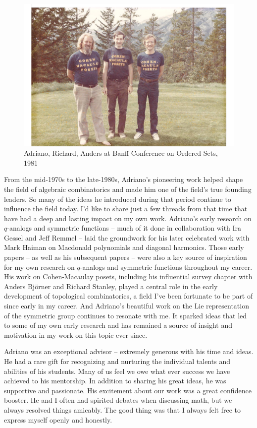 \documentclass{notices}
\begin{document}
\begin{figure}
    \centering
    \includegraphics[width=\linewidth]{Michelle_Wachs/cmposets.pdf} 
  {\footnotesize Adriano, Richard, Anders at Banff Conference on Ordered Sets, 1981}
\end{figure}
From the mid-1970s to the late-1980s, Adriano's pioneering work helped shape the field of algebraic combinatorics and made him  one of the field's true founding leaders. So many of the ideas he introduced during that  period continue to influence the field today. I'd like to share just a few threads from that time that have had a deep and lasting impact on my own work.
 Adriano's early research on 
$q$-analogs and symmetric functions -- much of it done in collaboration with Ira Gessel and Jeff Remmel -- laid the groundwork for his later celebrated work with Mark Haiman on Macdonald polynomials and diagonal harmonics. Those early papers -- as well as his subsequent papers --  were also a key source of inspiration for my own research on $q$-analogs and symmetric functions throughout my career. His work on Cohen-Macaulay posets, including his influential survey chapter  with Anders Bj\"orner and Richard Stanley, played a central role in the early development of topological combinatorics,  a field I've been fortunate to be part of since  early in my career. And Adriano's beautiful work on the Lie representation of the symmetric group continues to resonate with me. It sparked ideas that led to some of my own early research and has remained a source of insight and motivation in my work on this topic ever since.

Adriano was an exceptional advisor -- extremely generous with his time and ideas. He had a rare gift for recognizing and nurturing the individual talents and abilities of his students.   Many of us feel we owe what ever success we have achieved to his mentorship.  In addition to sharing his great ideas, he was supportive and passionate.  His excitement about our work was a great confidence booster.  He and I often had spirited debates when discussing math,  but we always resolved things amicably.   The good thing was that I always felt free to express myself openly and honestly. 
\end{document}
